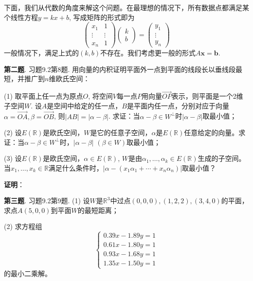 下面，我们从代数的角度来解这个问题。在最理想的情况下，所有数据点都满足某个线性方程$y = kx + b$, 写成矩阵的形式即为
$$
\begin{pmatrix} x_1 & 1 \\ \vdots & \vdots \\ x_n & 1 \end{pmatrix} \begin{pmatrix} k \\ b \end{pmatrix} = \begin{pmatrix} y_1 \\ \vdots \\ y_n \end{pmatrix}
$$
一般情况下，满足上式的$(k,b)$不存在。我们考虑更一般的形式$A\mathbf{x} = \mathbf{b}$. 


\newpageorvspace


{\bf 第二题}. 习题9.2第8题. 用向量的内积证明平面外一点到平面的线段长以垂线段最短，并推广到$n$维欧氏空间：

(1) 取平面上任一点为原点$O$, 将空间$V$每一点$P$用向量$\overrightarrow{OP}$表示，则平面是一个2维子空间$W$. 设$A$是空间中给定的任一点，$B$是平面内任一点，分别对应于向量$\alpha = \overrightarrow{OA}, \beta = \overrightarrow{OB}$, 则$\lvert AB \rvert = \lvert \alpha - \beta \rvert$. 求证：当$\alpha - \beta \in W^{\perp}$时$\lvert \alpha - \beta \rvert$取最小值；

(2) 设$E(\mathbb{R})$是欧氏空间，$W$是它的任意子空间，$\alpha$是$E(\mathbb{R})$任意给定的向量。求证：当$\alpha - \beta \in W^{\perp}$时，$\lvert \alpha - \beta \rvert$ $(\beta \in W)$取最小值；

(3) 设$E(\mathbb{R})$是欧氏空间，$\alpha \in E(\mathbb{R})$, $W$是由$\alpha_1, \ldots, \alpha_k \in E(\mathbb{R})$生成的子空间。当$x_1, \ldots, x_k \in \mathbb{R}$满足什么条件时，$\lvert \alpha - (x_1\alpha_1 + \cdots + x_n\alpha_n) \rvert$取最小值？

\newpageorvspace

{\bf 证明}：


\newpageorvspace


{\bf 第三题}. 习题9.2第9题. (1) 设$W$是$\mathbb{R}^3$中过点$(0,0,0), (1,2,2), (3,4,0)$的平面，求点$A (5,0,0)$到平面$W$的最短距离；

(2) 求方程组
$$
\begin{cases}
0.39x - 1.89y = 1 \\
0.61x - 1.80y = 1 \\
0.93x - 1.68y = 1 \\
1.35x - 1.50y = 1
\end{cases}
$$
的最小二乘解。

